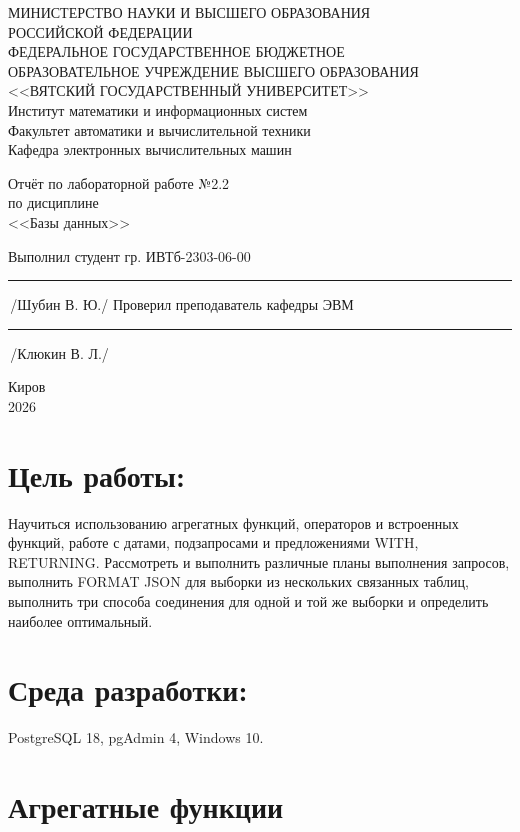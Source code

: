 \documentclass[oneside,a4paper,14pt]{extarticle}
\begin{document}
	\newpage\thispagestyle{empty}
	\begin{center}
		МИНИСТЕРСТВО НАУКИ И ВЫСШЕГО ОБРАЗОВАНИЯ\\
		РОССИЙСКОЙ ФЕДЕРАЦИИ\\
		ФЕДЕРАЛЬНОЕ ГОСУДАРСТВЕННОЕ БЮДЖЕТНОЕ\\
		ОБРАЗОВАТЕЛЬНОЕ УЧРЕЖДЕНИЕ ВЫСШЕГО ОБРАЗОВАНИЯ\\
		<<ВЯТСКИЙ ГОСУДАРСТВЕННЫЙ УНИВЕРСИТЕТ>>\\
		Институт математики и информационных систем\\
		Факультет автоматики и вычислительной техники\\
		Кафедра электронных вычислительных машин
	\end{center}
	\vspace{20mm}
	\begin{center}
		Отчёт по лабораторной работе №2.2\\
		по дисциплине\\
		<<Базы данных>>\\
	\end{center}
	\vspace{48mm}
	\noindent
	Выполнил студент гр. ИВТб-2303-06-00 \hfill \rule[-0,5mm]{30mm}{0.15mm}\,/Шубин В. Ю./
	\newline
	Проверил преподаватель кафедры ЭВМ \hfill \rule[-0,5mm]{30mm}{0.15mm}\,/Клюкин В. Л./
	\vfill
	\begin{center}
		Киров\\
		2026
	\end{center}
	\newpage
	\thispagestyle{empty}
	\section*{Цель работы:} Научиться использованию агрегатных функций, операторов и встроенных функций, работе с датами, подзапросами и предложениями WITH, RETURNING. Рассмотреть и выполнить различные планы выполнения запросов, выполнить FORMAT JSON для выборки из нескольких связанных таблиц, выполнить три способа соединения для одной и той же выборки и определить наиболее оптимальный.
	
	\section*{Среда разработки:} PostgreSQL 18, pgAdmin 4, Windows 10.
	
	\newpage
	
	\section*{Агрегатные функции}
	
\end{document}
